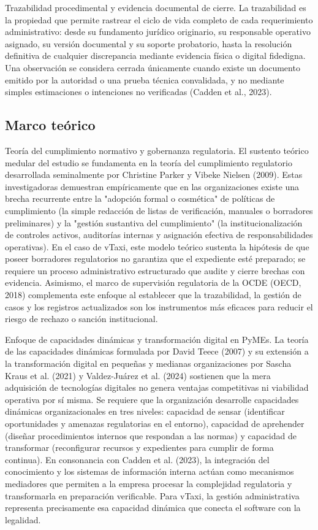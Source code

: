 {Trazabilidad procedimental y evidencia documental de cierre. La trazabilidad es la propiedad que permite rastrear el ciclo de vida completo de cada requerimiento administrativo: desde su fundamento jurídico originario, su responsable operativo asignado, su versión documental y su soporte probatorio, hasta la resolución definitiva de cualquier discrepancia mediante evidencia física o digital fidedigna. Una observación se considera cerrada únicamente cuando existe un documento emitido por la autoridad o una prueba técnica convalidada, y no mediante simples estimaciones o intenciones no verificadas (Cadden et al., 2023).


\subsection{Marco teórico}
Teoría del cumplimiento normativo y gobernanza regulatoria. El sustento teórico medular del estudio se fundamenta en la teoría del cumplimiento regulatorio desarrollada seminalmente por Christine Parker y Vibeke Nielsen (2009). Estas investigadoras demuestran empíricamente que en las organizaciones existe una brecha recurrente entre la "adopción formal o cosmética" de políticas de cumplimiento (la simple redacción de listas de verificación, manuales o borradores preliminares) y la "gestión sustantiva del cumplimiento" (la institucionalización de controles activos, auditorías internas y asignación efectiva de responsabilidades operativas). En el caso de vTaxi, este modelo teórico sustenta la hipótesis de que poseer borradores regulatorios no garantiza que el expediente esté preparado; se requiere un proceso administrativo estructurado que audite y cierre brechas con evidencia. Asimismo, el marco de supervisión regulatoria de la OCDE (OECD, 2018) complementa este enfoque al establecer que la trazabilidad, la gestión de casos y los registros actualizados son los instrumentos más eficaces para reducir el riesgo de rechazo o sanción institucional.


Enfoque de capacidades dinámicas y transformación digital en PyMEs. La teoría de las capacidades dinámicas formulada por David Teece (2007) y su extensión a la transformación digital en pequeñas y medianas organizaciones por Sascha Kraus et al. (2021) y Valdez-Juárez et al. (2024) sostienen que la mera adquisición de tecnologías digitales no genera ventajas competitivas ni viabilidad operativa por sí misma. Se requiere que la organización desarrolle capacidades dinámicas organizacionales en tres niveles: capacidad de sensar (identificar oportunidades y amenazas regulatorias en el entorno), capacidad de aprehender (diseñar procedimientos internos que respondan a las normas) y capacidad de transformar (reconfigurar recursos y expedientes para cumplir de forma continua). En consonancia con Cadden et al. (2023), la integración del conocimiento y los sistemas de información interna actúan como mecanismos mediadores que permiten a la empresa procesar la complejidad regulatoria y transformarla en preparación verificable. Para vTaxi, la gestión administrativa representa precisamente esa capacidad dinámica que conecta el software con la legalidad.


}
